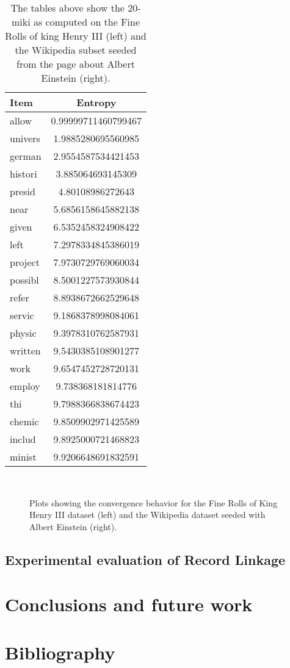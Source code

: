 \documentclass[paper=a4, fontsize=11pt]{scrartcl}
\begin{document}
\begin{table}
\begin{minipage}{.5\textwidth}
        \small
        \centering
    	\begin{tabular}{l S[round-precision=4]}
    		\toprule
    		{Item} & {Entropy}\\
    		\midrule
    		allow & 0.99999711460799467\\
    		univers & 1.9885280695560985\\
    		german & 2.9554587534421453\\
    		histori & 3.885064693145309\\
    		presid & 4.80108986272643\\
    		near & 5.6856158645882138\\
    		given & 6.5352458324908422\\
    		left & 7.2978334845386019\\
    		project & 7.9730729769060034\\
    		possibl & 8.5001227573930844\\
    		refer & 8.8938672662529648\\
    		servic & 9.1868378998084061\\
    		physic & 9.3978310762587931\\
    		written & 9.5430385108901277\\
    		work & 9.6547452728720131\\
    		employ & 9.738368181814776\\
    		thi & 9.7988366838674423\\
    		chemic & 9.8509902971425589\\
    		includ & 9.8925000721468823\\
    		minist & 9.9206648691832591\\
    		\bottomrule
    	\end{tabular}
    	\label{t:miki_wikipedia}
    \end{minipage}
    \caption{The tables above show the 20-miki as computed on the Fine Rolls of king Henry III (left) and the Wikipedia subset seeded from the page about Albert Einstein (right).}
\end{table}

\begin{figure}
    ~
    
    \caption{Plots showing the convergence behavior for the Fine Rolls of King Henry III dataset (left) and the Wikipedia dataset seeded with Albert Einstein (right).}\label{fig:1}
\end{figure}

\subsection{Experimental evaluation of Record Linkage}




\section{Conclusions and future work}




\section{Bibliography}


\end{document}
